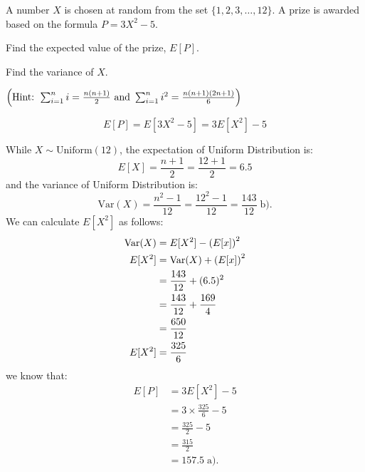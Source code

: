 \documentclass[a4paper, 10pt]{article}
\begin{document}
\begin{tosubmit}
\problem[6]
A number \( X \) is chosen at random from the set \( \{1, 2, 3, \dots , 12\} \).
A prize is awarded based on the formula \( P = 3X^2 - 5 \).
\begin{subproblems}
    \item Find the expected value of the prize, \( E[P] \).
    \item Find the variance of \( X \).
\end{subproblems}
\( \left(\text{Hint: } \sum_{i=1}^n i = \frac{n(n+1)}{2} \text{ and } \sum_{i=1}^n i^2 = \frac{n(n+1)(2n+1)}{6}\right) \)

\vspace{2mm}

\par\noindent\submitsolution
\[
    E[P] = E[3X^2 - 5] = 3E[X^2] - 5
\]

\vspace{2mm}

\par\noindent While \( X \sim \text{Uniform}(12) \), the expectation of Uniform Distribution is:
\[
    E[X] = \frac{n+1}{2} = \frac{12+1}{2} = 6.5
\]
and the variance of Uniform Distribution is:
\[
    \text{Var}(X) = \frac{n^2 - 1}{12} = \frac{12^2 - 1}{12} = \boxed{\frac{143}{12}} \; \text{b).}
\]
We can calculate \( E[X^2] \) as follows:
\begin{align*}    
    \text{Var}(X) &= E[X^2] - \left(E[x]\right)^2 \\
    E[X^2] &= \text{Var}(X) + \left(E[x]\right)^2 \\
    &= \frac{143}{12} + (6.5)^2 \\
    &= \frac{143}{12} + \frac{169}{4} \\
    &= \frac{650}{12} \\
    E[X^2] &= \frac{325}{6}
\end{align*}
we know that:
\begin{align*}
  E[P] &= 3E[X^2] - 5 \\
  &= 3 \times \frac{325}{6} - 5 \\
  &= \frac{325}{2} - 5 \\
  &= \frac{315}{2} \\
  &= \boxed{157.5} \; \text{a).}
\end{align*}
\end{tosubmit}
\end{document}
